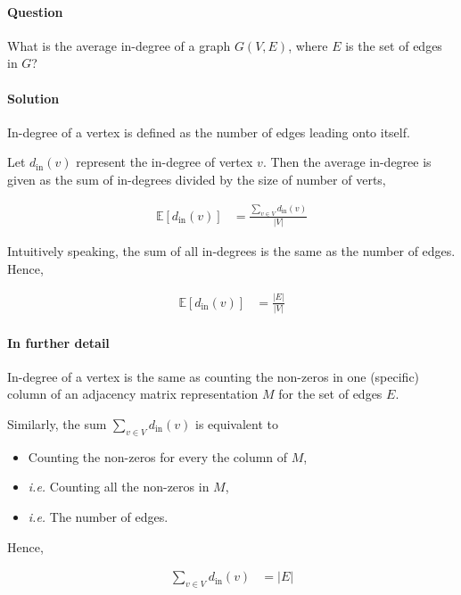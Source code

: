\documentclass[11pt]{article}
\begin{document}
\paragraph*{Question}
\label{sec:orgb3e5583}
What is the average in-degree of a graph \(G(V,E)\),
where \(E\) is the set of edges in \(G\)?

\paragraph*{Solution}
\label{sec:org62eb70d}
In-degree of a vertex is defined as the number of
edges leading onto itself.

Let \(d_{\mathrm{in}}(v)\) represent the in-degree of
vertex \(v\).  Then the average in-degree is given as the
sum of in-degrees divided by the size of number of
verts,

\begin{align*}
  \mathbb{E}[d_{\mathrm{in}}(v)]
  &= \frac{\sum_{v\in V}d_{\mathrm{in}}(v)} {|V|}
\end{align*}

Intuitively speaking, the sum of all in-degrees is the
same as the number of edges. Hence,

\begin{align*}
  \mathbb{E}[d_{\mathrm{in}}(v)]
  &= \frac{|E|} {|V|}
\end{align*}

\paragraph*{In further detail}
\label{sec:org3c0ea53}

In-degree of a vertex is the same as counting the
non-zeros in one (specific) column of an adjacency
matrix representation \(M\) for the set of edges \(E\).

Similarly, the sum \(\sum_{v\in V}d_{\mathrm{in}}(v)\) is
equivalent to

\begin{itemize}
\item Counting the non-zeros for every the column of \(M\),
\item \emph{i.e.} Counting all the non-zeros in \(M\),
\item \emph{i.e.} The number of edges.
\end{itemize}

Hence,

\begin{align*}
  \sum_{v\in V} d_{\mathrm{in}}(v)
    &= |E|
\end{align*}
\end{document}
